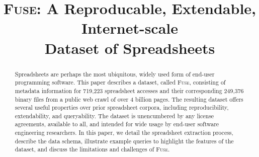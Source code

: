 \documentclass[conference]{IEEEtran}
\begin{document}
%
\title{\textsc{Fuse}: A Reproducable, Extendable, Internet-scale\\Dataset of Spreadsheets}

\author{
}

\maketitle

\begin{abstract}
Spreadsheets are perhaps the most ubiquitous, widely used form of end-user programming software. This paper describes a dataset, called \textsc{Fuse}, consisting of metadata information for 719,223 spreadsheet accesses and their corresponding 249,376 binary files from a public web crawl of over 4 billion pages. The resulting dataset offers several useful properties over prior spreadsheet corpora, including reproducibility, extendability, and queryability. The dataset is unencumbered by any license agreements, available to all, and intended for wide usage by end-user software engineering researchers. In this paper, we detail the spreadsheet extraction process, describe the data schema, illustrate example queries to highlight the features of the dataset, and discuss the limitations and challenges of \textsc{Fuse}.
\end{abstract}


\IEEEpeerreviewmaketitle


\end{document}
